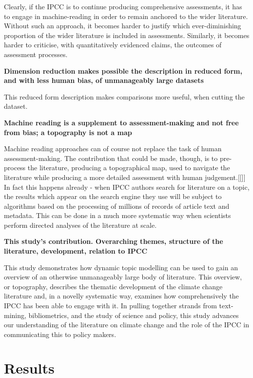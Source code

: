 \documentclass{article}
\begin{document}
\begin{linenumbers}
Clearly, if the IPCC is to continue producing comprehensive assessments, it has to engage in machine-reading in order to remain anchored to the wider literature. Without such an approach, it becomes harder to justify which ever-diminishing proportion of the wider literature is included in assessments. Similarly, it becomes harder to criticise, with quantitatively evidenced claims, the outcomes of assessment processes.


\bigskip
\noindent\textbf{Dimension reduction makes possible the description in reduced form, and with less human bias, of unmanageably large datasets}

\citep{Greene2016} \citep{Lee1999}

This reduced form description makes comparisons more useful, when cutting the dataset.

\bigskip
\noindent\textbf{Machine reading is a supplement to assessment-making and not free from bias; a topography is not a map}

Machine reading approaches can of course not replace the task of human assessment-making. The contribution that could be made, though, is to pre-process the literature, producing a topographical map, used to navigate the literature while producing a more detailed assessment with human judgement.[[]] In fact this happens already - when IPCC authors search for literature on a topic, the results which appear on the search engine they use will be subject to algorithms based on the processing of millions of records of article text and metadata. This can be done in a much more systematic way when scientists perform directed analyses of the literature at scale.


\bigskip
\noindent\textbf{This study's contribution. Overarching themes, structure of the literature, development, relation to IPCC}

This study demonstrates how dynamic topic modelling can be used to gain an overview of an otherwise unmanageably large body of literature. This overview, or topography, describes the thematic development of the climate change literature and, in a novelly systematic way, examines how  comprehensively the IPCC has been able to engage with it. In pulling together strands from text-mining, bibliometrics, and the study of science and policy, this study advances our understanding of the literature on climate change and the role of the IPCC in communicating this to policy makers.


\section*{Results}


\end{linenumbers}
\end{document}

